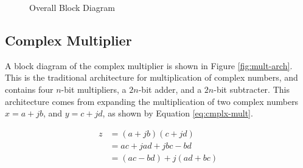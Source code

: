 \begin{figure}[ht]
	\caption{Overall Block Diagram}
	\label{fig:overall-block-diag}
\end{figure}

\FloatBarrier
\subsection{Complex Multiplier} \label{sec:design-mult}

A block diagram of the complex multiplier is shown in Figure \ref{fig:mult-arch}. This is the traditional architecture for multiplication of complex numbers, and contains four $n$-bit multipliers, a $2n$-bit adder, and a $2n$-bit subtracter. This architecture comes from expanding the multiplication of two complex numbers $x = a + jb$, and $y = c + jd$, as shown by Equation \ref{eq:cmplx-mult}.

\begin{align}
	z &= (a+jb)(c+jd) \nonumber \\
	  &= ac + jad + jbc - bd \nonumber \\
	  &= (ac - bd) + j(ad + bc) \label{eq:cmplx-mult}
\end{align}

